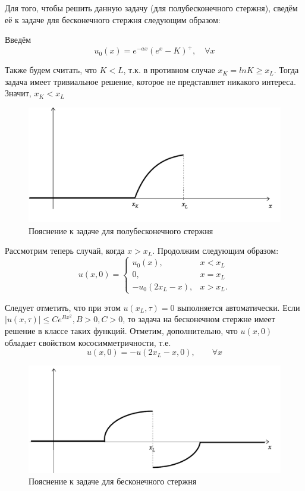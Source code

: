\documentclass[oneside,final,12pt]{article}
\begin{document}
Для того, чтобы решить данную задачу (для полубесконечного стержня), сведём её к задаче для бесконечного стержня следующим образом:

Введём 
$$
u_0(x) = e^{-ax}(e^x-K)^+, \quad \forall x
$$

Также будем считать, что $K<L$, т.к. в противном случае $x_K=ln K \geq x_L$. Тогда задача имеет тривиальное решение, которое не представляет никакого интереса. Значит, $x_K<x_L$

\begin{figure}
    \centering
    \includegraphics[scale=0.9]{Graph3.pdf}
    \caption{Пояснение к задаче для полубесконечного стержня}
    \label{ajajaja1}
\end{figure}

Рассмотрим теперь случай, когда $x>x_L$. Продолжим следующим образом:
$$
u(x,0)=
\begin{cases}
u_0(x), &x<x_L \\
0, &x=x_L \\
-u_0(2x_L-x), &x>x_L.
\end{cases}
$$

Следует отметить, что при этом $u(x_L,\tau)=0$ выполняется автоматически. Если $|u(x,\tau)| \leq Ce^{Bx^2}, B>0, C>0$, то задача на бесконечном стержне имеет решение в классе таких функций. Отметим, дополнительно, что $u(x,0)$ обладает свойством кососимметричности, т.е.
$$
u(x,0)=-u(2x_L-x,0), \qquad \forall x
$$
\begin{figure}[h]
    \centering
    \includegraphics[scale=0.9]{Graph4.pdf}
    \caption{Пояснение к задаче для бесконечного стержня}
    \label{ajajaja2}
\end{figure}
\end{document}
